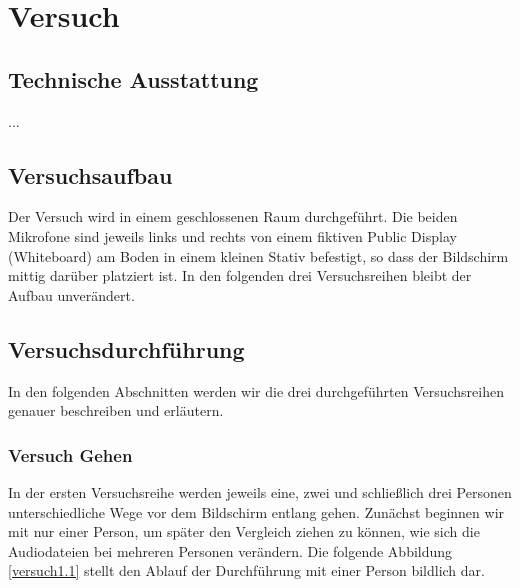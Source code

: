 \chapter{Versuch}

\section{Technische Ausstattung}

...

\section{Versuchsaufbau}

Der Versuch wird in einem geschlossenen Raum durchgeführt. Die beiden Mikrofone sind jeweils links und rechts von einem fiktiven Public Display (Whiteboard) am Boden in einem kleinen Stativ befestigt, so dass der Bildschirm mittig darüber platziert ist. In den folgenden drei Versuchsreihen bleibt der Aufbau unverändert. 

\section{Versuchsdurchführung}

In den folgenden Abschnitten werden wir die drei durchgeführten Versuchsreihen genauer beschreiben und erläutern.

\subsection{Versuch Gehen}

In der ersten Versuchsreihe werden jeweils eine, zwei und schließlich drei Personen unterschiedliche Wege vor dem Bildschirm entlang gehen. Zunächst beginnen wir mit nur einer Person, um später den Vergleich ziehen zu können, wie sich die Audiodateien bei mehreren Personen verändern. Die folgende Abbildung \ref{versuch1.1} stellt den Ablauf der Durchführung mit einer Person bildlich dar.

